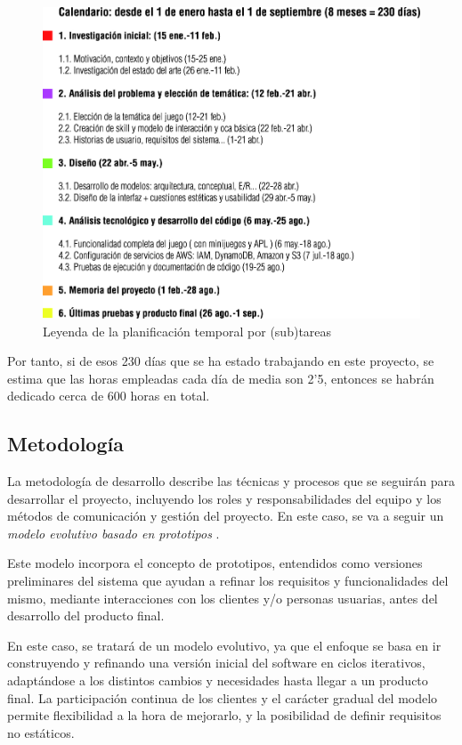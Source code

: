 \begin{figure}[H]
	\centering
	\includegraphics[width=1\textwidth]{imgs/tabla-planning2.jpg}
	\caption{Leyenda de la planificación temporal por (sub)tareas}
	\label{fig:planning2}
\end{figure}

Por tanto, si de esos 230 días que se ha estado trabajando en este proyecto, se estima que las horas empleadas cada día de media son 2'5, entonces se habrán dedicado cerca de 600 horas en total.

\newpage

\subsection{Metodología}

La metodología de desarrollo describe las técnicas y procesos que se seguirán para desarrollar el proyecto, incluyendo los roles y responsabilidades del equipo y los métodos de comunicación y gestión del proyecto. En este caso, se va a seguir un \textit{modelo evolutivo basado en prototipos} \parencite{carr1997prototyping}.

Este modelo incorpora el concepto de prototipos, entendidos como versiones preliminares del sistema que ayudan a refinar los requisitos y funcionalidades del mismo, mediante interacciones con los clientes y/o personas usuarias, antes del desarrollo del producto final.

En este caso, se tratará de un modelo evolutivo, ya que el enfoque se basa en ir construyendo y refinando una versión inicial del software en ciclos iterativos, adaptándose a los distintos cambios y necesidades hasta llegar a un producto final. La participación continua de los clientes y el carácter gradual del modelo permite flexibilidad a la hora de mejorarlo, y la posibilidad de definir requisitos no estáticos.

